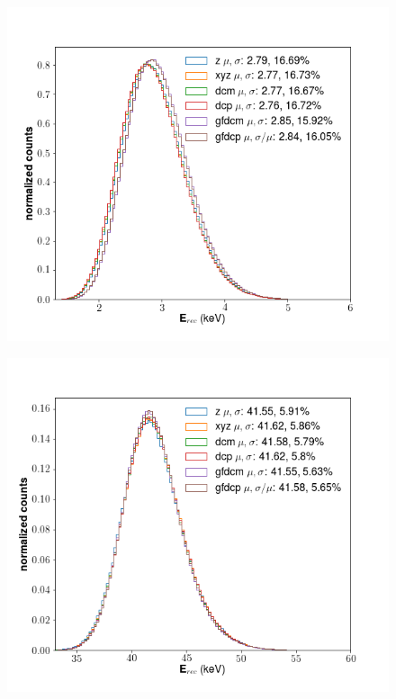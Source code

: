 \begin{figure}[h!]
\centering
  \includegraphics[width=\textwidth]{Figures/E_spec_Ar.png}
  \caption{}
\label{fig:E_spec_Ar} 
\end{figure}
  
\begin{figure}[h!]
  \centering
  \includegraphics[width=\textwidth]{Figures/E_spec_Kr.png}
  \caption{}
\label{fig:E_spec_Kr} 
\end{figure}

